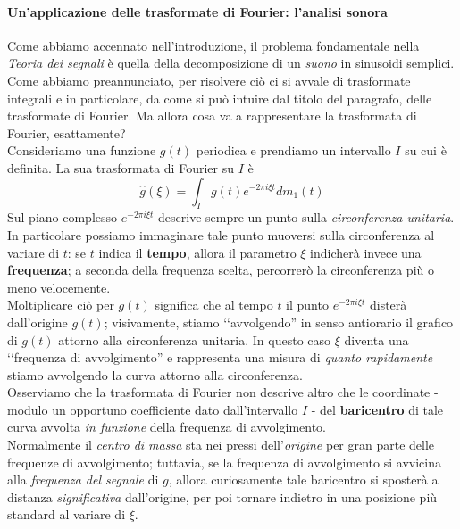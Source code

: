 \paragraph{Un'applicazione delle trasformate di Fourier: l'analisi sonora}
Come abbiamo accennato nell'introduzione, il problema fondamentale nella \textit{Teoria dei segnali} è quella della decomposizione di un \textit{suono} in sinusoidi semplici. Come abbiamo preannunciato, per risolvere ciò ci si avvale di trasformate integrali e in particolare, da come si può intuire dal titolo del paragrafo, delle trasformate di Fourier.
Ma allora cosa va a rappresentare la trasformata di Fourier, esattamente?\\
Consideriamo una funzione $g(t)$ periodica e prendiamo un intervallo $I$ su cui è definita. La sua trasformata di Fourier su $I$ è
\begin{equation*}
	\displaystyle\hat{g}(\xi)=\displaystyle\int_{I}g(t)e^{-2\pi i\xi t}dm_1(t)
\end{equation*}
Sul piano complesso $e^{-2\pi i\xi t}$ descrive sempre un punto sulla \textit{circonferenza unitaria}. In particolare possiamo immaginare tale punto muoversi sulla circonferenza al variare di $t$: se $t$ indica il \textbf{tempo}, allora il parametro $\xi$ indicherà invece una \textbf{frequenza}; a seconda della frequenza scelta, percorrerò la circonferenza più o meno velocemente.\\
Moltiplicare ciò per $g(t)$ significa che al tempo $t$ il punto $e^{-2\pi i\xi t}$ disterà dall'origine $g(t)$; visivamente, stiamo ‘‘avvolgendo'' in senso antiorario il grafico di $g(t)$ attorno alla circonferenza unitaria. In questo caso $\xi$ diventa una ‘‘frequenza di avvolgimento'' e rappresenta una misura di \textit{quanto rapidamente} stiamo avvolgendo la curva attorno alla circonferenza.\\
Osserviamo che la trasformata di Fourier non descrive altro che le coordinate - modulo un opportuno coefficiente dato dall'intervallo $I$ - del \textbf{baricentro} di tale curva avvolta \textit{in funzione} della frequenza di avvolgimento.\\
Normalmente il \textit{centro di massa} sta nei pressi dell'\textit{origine} per gran parte delle frequenze di avvolgimento; tuttavia, se la frequenza di avvolgimento si avvicina alla \textit{frequenza del segnale} di $g$, allora curiosamente tale baricentro si sposterà a distanza \textit{significativa} dall'origine, per poi tornare indietro in una posizione più standard al variare di $\xi$.\\
